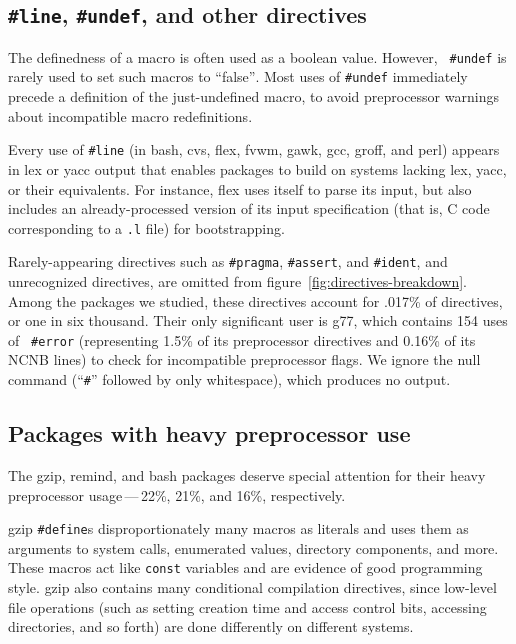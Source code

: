 \documentclass[10pt]{article}
\newcommand{\pkg}[1]{\textsf{#1}}
\begin{document}
\subsection{{\tt \#line}, {\tt \#undef}, and other directives}

The definedness of a macro is often used as a boolean value.  However, {\tt
\#undef} is rarely used to set such macros to ``false''$\!$.  Most uses of
{\tt \#undef} immediately precede a definition of the just-undefined macro,
to avoid preprocessor warnings about incompatible macro redefinitions.

Every use of {\tt \#line} (in \pkg{bash}, \pkg{cvs}, \pkg{flex}, \pkg{fvwm},
\pkg{gawk}, \pkg{gcc}, \pkg{groff}, and \pkg{perl}) appears in lex or yacc
output that enables packages to build on systems lacking lex, yacc, or
their equivalents.  For instance, \pkg{flex} uses itself to parse its
input, but also includes an already-processed version of its input
specification (that is, C code corresponding to a {\tt .l} file) for
bootstrapping.


Rarely-appearing directives such as {\tt \#pragma}, {\tt \#assert}, and
{\tt \#ident}, and unrecognized directives, are omitted from
figure~\ref{fig:directives-breakdown}.  Among the packages we studied,
these directives account for .017\% of directives, or one in six thousand.
Their only significant user is \pkg{g77}, which contains 154 uses of {\tt
\#error} (representing 1.5\% of its preprocessor directives and 0.16\% of
its NCNB lines) to check for incompatible preprocessor flags.  We ignore
the null command (``{\tt \#}'' followed by only whitespace), which produces
no output.


\subsection{Packages with heavy preprocessor use}

The \pkg{gzip}, \pkg{remind}, and \pkg{bash} packages deserve
special attention for their heavy preprocessor usage\,---\,22\%, 21\%, and
16\%, respectively.

\pkg{gzip} {\tt \#define}s disproportionately many macros as literals and
uses them as arguments to system calls, enumerated values, directory
components, and more.  These macros act like {\tt const} variables and are
evidence of good programming style.  \pkg{gzip} also contains many
conditional compilation directives, since low-level file operations (such
as setting creation time and access control bits, accessing directories,
and so forth) are done differently on different systems.
\end{document}
